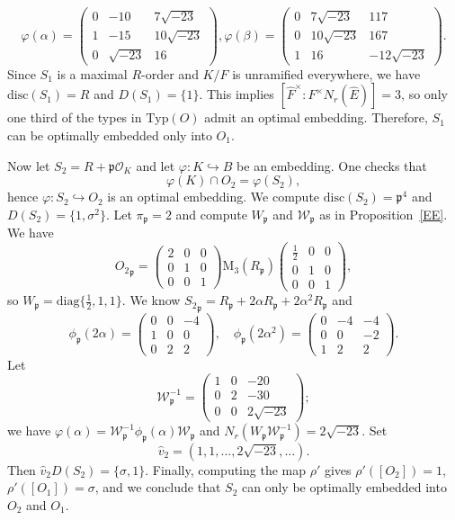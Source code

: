 \documentclass[12pt]{article}
\theoremstyle{plain}
\theoremstyle{definition}
\theoremstyle{remark}
\begin{document}
$$\varphi(\alpha)=\begin{pmatrix}
0 & -10 & 7\sqrt{-23}\\
1 & -15 & 10\sqrt{-23}\\
0 & \sqrt{-23} & 16
\end{pmatrix},
\varphi(\beta)=\begin{pmatrix}
0 & 7\sqrt{-23} & 117\\
0 & 10\sqrt{-23} & 167\\
1 & 16 & -12\sqrt{-23}
\end{pmatrix}.$$
Since $S_1$ is a maximal $R$-order and $K/F$ is unramified everywhere, we have $\mathrm{disc}(S_1)=R$ and $D(S_1)=\{1\}$. This implies $[\widehat{F}^\times:F^\times N_r(\widehat{E})]=3$, so only one third of the types in $\mathrm{Typ}(O)$ admit an optimal embedding. Therefore, $S_1$ can be optimally embedded only into $O_1$.

Now let $S_2=R+\mathfrak{p}\mathcal{O}_K$ and let $\varphi:K\hookrightarrow B$ be an embedding. One checks that $$\varphi(K)\cap O_2=\varphi(S_2),$$ hence $\varphi:S_2\hookrightarrow O_2$ is an optimal embedding. We compute $\mathrm{disc}(S_2)=\mathfrak{p}^4$ and $D(S_2)=\{1,\sigma^2\}$. Let $\pi_\mathfrak{p}=2$ and compute $W_\mathfrak{p}$ and $\mathcal{W}_\mathfrak{p}$ as in Proposition~\ref{EE}. We have 
$${O_2}_\mathfrak{p}=\begin{pmatrix}
2 & 0 & 0\\
0 & 1 & 0\\
0 & 0 & 1
\end{pmatrix}\mathrm{M}_3(R_\mathfrak{p})\begin{pmatrix}
\frac{1}{2} & 0 & 0\\
0 & 1 & 0\\
0 & 0 & 1
\end{pmatrix},$$
so $W_\mathfrak{p}=\mathrm{diag}\{\frac{1}{2},1,1\}$. We know ${S_2}_\mathfrak{p}=R_\mathfrak{p}+2\alpha R_\mathfrak{p}+2\alpha^2 R_\mathfrak{p}$ and 
$$\phi_\mathfrak{p}(2\alpha)=\begin{pmatrix}
0 & 0 & -4\\
1 & 0 & 0\\
0 & 2 & 2
\end{pmatrix},\quad
\phi_\mathfrak{p}(2\alpha^2)=\begin{pmatrix}
0 & -4 & -4\\
0 & 0 & -2\\
1 & 2 & 2
\end{pmatrix}.$$
Let 
$$\mathcal{W}_\mathfrak{p}^{-1}=\begin{pmatrix}
1 & 0 & -20\\
0 & 2 & -30\\
0 & 0 & 2\sqrt{-23}
\end{pmatrix};$$ 
we have $\varphi(\alpha)=\mathcal{W}_\mathfrak{p}^{-1}\phi_\mathfrak{p}(\alpha)\mathcal{W}_\mathfrak{p}$ and $N_r(W_\mathfrak{p}\mathcal{W}_\mathfrak{p}^{-1})=2\sqrt{-23}$. Set
$$\widehat{v}_2=(1,1,\dots,2\sqrt{-23},\dots).$$
Then $\widehat{v}_2D(S_2)=\{\sigma,1\}$. Finally, computing the map $\rho'$ gives $\rho'([O_2])=1$, $\rho'([O_1])=\sigma$, and we conclude that $S_2$ can only be optimally embedded into $O_2$ and $O_1$.
\end{document}
